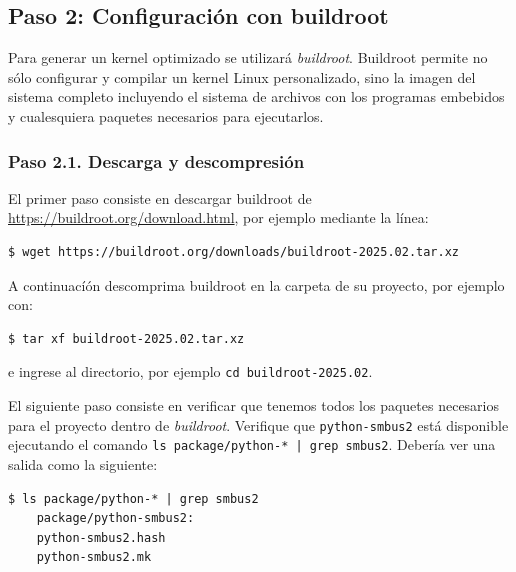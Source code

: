 %
%



\subsection{Paso 2: Configuración con buildroot}%
\label{sec:step2}
Para generar un kernel optimizado se utilizará \emph{buildroot}.
Buildroot permite no sólo configurar y compilar un kernel Linux personalizado, sino la imagen del sistema completo incluyendo el sistema de archivos con los programas embebidos y cualesquiera paquetes necesarios para ejecutarlos.


\subsubsection*{Paso 2.1. Descarga y descompresión}

El primer paso consiste en descargar buildroot de \url{https://buildroot.org/download.html}, por ejemplo mediante la línea:

\begin{Verbatim}[gobble=1]
	$ wget https://buildroot.org/downloads/buildroot-2025.02.tar.xz
\end{Verbatim}

\noindent
A continuacíón descomprima buildroot en la carpeta de su proyecto, por ejemplo con:

\begin{Verbatim}[gobble=1]
	$ tar xf buildroot-2025.02.tar.xz
\end{Verbatim}

\noindent
e ingrese al directorio, por ejemplo \texttt{cd buildroot-2025.02}.

El siguiente paso consiste en verificar que tenemos todos los paquetes necesarios para el proyecto dentro de \emph{buildroot}.
Verifique que \texttt{python-smbus2} está disponible ejecutando el comando \texttt{ls package/python-* | grep smbus2}.
Debería ver una salida como la siguiente:
\begin{Verbatim}[gobble=1]
	$ ls package/python-* | grep smbus2
	package/python-smbus2:
	python-smbus2.hash
	python-smbus2.mk
\end{Verbatim}

